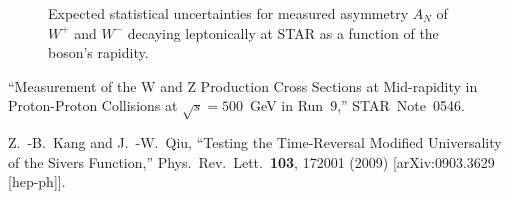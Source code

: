 \documentclass[12pt]{article}
\begin{document}
\begin{figure}

\caption[]{Expected statistical uncertainties for measured asymmetry $A_N$ of
$W^+$  and $W^-$ 
decaying leptonically at STAR as a function of the boson's rapidity.}

\label{fig:MC_Wmeas_stat} 
\end{figure}


\newpage

\begin{thebibliography}{9}

``Measurement of the W and Z Production Cross Sections at Mid-rapidity in Proton-Proton Collisions at $\sqrt{s} = 500$~GeV in Run~9,'' STAR~Note~0546.

  Z.~-B.~Kang and J.~-W.~Qiu,
  ``Testing the Time-Reversal Modified Universality of the Sivers Function,''
  Phys.\ Rev.\ Lett.\  {\bf 103}, 172001 (2009)
  [arXiv:0903.3629 [hep-ph]].

\end{thebibliography}
\end{document}
